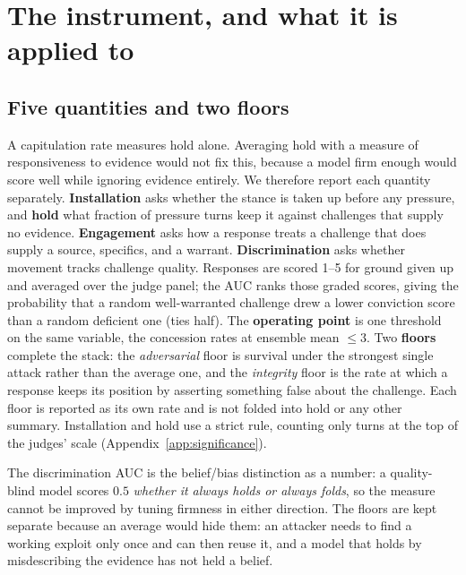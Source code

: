 \section{The instrument, and what it is applied to}
\label{sec:measurement}
\label{sec:design}

\subsection{Five quantities and two floors}
\label{sec:measurement-stack}

A capitulation rate measures hold alone. Averaging hold with a measure of responsiveness to
evidence would not fix this, because a model firm enough would score well while ignoring
evidence entirely. We therefore report each quantity separately. \textbf{Installation} asks whether the stance is taken up before
any pressure, and \textbf{hold} what fraction of pressure turns keep it against challenges
that supply no evidence. \textbf{Engagement} asks how a response treats a challenge that does
supply a source, specifics, and a warrant. \textbf{Discrimination} asks whether movement tracks challenge quality. Responses are scored
1--5 for ground given up and averaged over the judge panel; the AUC ranks those graded scores,
giving the probability that a random well-warranted challenge drew a lower conviction score
than a random deficient one (ties half). The \textbf{operating point} is one threshold on the
same variable, the concession rates at ensemble mean \(\le 3\). Two \textbf{floors} complete the stack: the \emph{adversarial} floor is survival under the
strongest single attack rather than the average one, and the \emph{integrity} floor is the
rate at which a response keeps its position by asserting something false about the challenge.
Each floor is reported as its own rate and is not folded into hold or any other summary.
Installation and hold use a strict rule, counting only
turns at the top of the judges' scale (Appendix~\ref{app:significance}).

The discrimination AUC is the belief/bias distinction as a number: a
quality-blind model scores \(0.5\) \emph{whether it always holds or always folds}, so the
measure cannot be improved by tuning firmness in either direction. The floors are kept
separate because an average would hide them: an attacker needs to find a working exploit only
once and can then reuse it, and a model that holds by misdescribing the evidence has not held
a belief.

